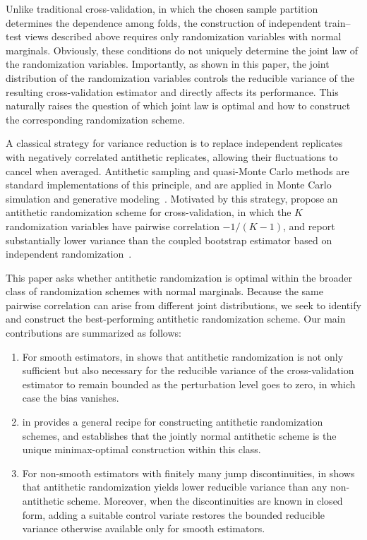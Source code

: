 \documentclass[12pt]{article}
\theoremstyle{general}
\begin{document}
Unlike traditional cross-validation, in which the chosen sample partition determines the dependence among folds, the construction of independent train--test views described above requires only randomization variables with normal marginals.
Obviously, these conditions do not uniquely determine the joint law of the randomization variables.
Importantly, as shown in this paper, the joint distribution of the randomization variables controls the reducible variance of the resulting cross-validation estimator and directly affects its performance.
This naturally raises the question of which joint law is optimal and how to construct the corresponding randomization scheme.

A classical strategy for variance reduction is to replace independent replicates with negatively correlated antithetic replicates, allowing their fluctuations to cancel when averaged. 
Antithetic sampling and quasi-Monte Carlo methods are standard implementations of this principle, and are applied in Monte Carlo simulation and generative modeling~\citep{hammersley1956new, owen2013monte, jia2026antithetic}.
Motivated by this strategy, \citet{liu2024cross} propose an antithetic randomization scheme for cross-validation, in which the $K$ randomization variables have pairwise correlation $-1/(K-1)$, and report substantially lower variance than the coupled bootstrap estimator based on independent randomization~\citep{oliveira2024unbiased}.

This paper asks whether antithetic randomization is optimal within the broader class of randomization schemes with normal marginals.
Because the same pairwise correlation can arise from different joint distributions, we seek to identify and construct the best-performing antithetic randomization scheme.
Our main contributions are summarized as follows:
\begin{enumerate}[leftmargin=*]
\item For smooth estimators,  in  shows that antithetic randomization is not only sufficient but also necessary for the reducible variance of the cross-validation estimator to remain bounded as the perturbation level goes to zero, in which case the bias vanishes.
\item {} in  provides a general recipe for constructing antithetic randomization schemes, and  establishes that the jointly normal antithetic scheme is the unique minimax-optimal construction within this class.
\item For non-smooth estimators with finitely many jump discontinuities,  in  shows that antithetic randomization yields lower reducible variance than any non-antithetic scheme. Moreover, when the discontinuities are known in closed form, adding a suitable control variate restores the bounded reducible variance otherwise available only for smooth estimators.
\end{enumerate}
\end{document}
